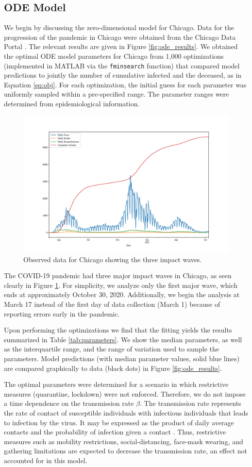 \documentclass[11pt]{article}
\begin{document}
\subsection{ODE Model}
We begin by discussing the zero-dimensional model for Chicago.
Data for the progression of the pandemic in Chicago were obtained from the Chicago Data Portal \cite{Chicago_2021}.
The relevant results are given in Figure \ref{fig:ode_results}.
We obtained the optimal ODE model parameters for Chicago from 1,000 optimizations (implemented in MATLAB via the \verb|fminsearch| function)
that compared model predictions to jointly the number of cumulative infected and the deceased, as in Equation \ref{eq:obj}.
For each optimization, the initial guess for each parameter was uniformly sampled within a pre-specified range.
The parameter ranges were determined from epidemiological information.

\begin{figure}[h]
	\centering
	\includegraphics[width=.6\textwidth]{obs_data}
	\caption{Observed data for Chicago showing the three impact waves.}
	\label{fig:obs_data}
\end{figure}

The COVID-19 pandemic had three major impact waves in Chicago, as seen clearly in Figure \ref{fig:obs_data}.
For simplicity, we analyze only the first major wave, which ends at approximately October 30, 2020.
Additionally, we begin the analysis at March 17 instead of the first day of data collection (March 1) because of reporting errors early in the pandemic.

Upon performing the optimizations we find that the fitting yields the results summarized in Table \ref{tab:parameters}.
We show the median parameters, as well as the interquartile range, and the range of variation used to sample the parameters.
Model predictions (with median parameter values, solid blue lines) are compared graphically to data (black dots) in Figure \ref{fig:ode_results}.

The optimal parameters were determined for a scenario in which restrictive measures (quarantine, lockdown) were not enforced.
Therefore, we do not impose a time dependence on the transmission rate $\beta$.
The transmission rate represents the rate of contact of susceptible individuals with infectious individuals that leads to infection by the virus.
It may be expressed as the product of daily average contacts and the probability of infection given a contact \cite{Drossinos_2020}.
Thus, restrictive measures such as mobility restrictions, social-distancing, face-mask wearing, and gathering limitations are expected to decrease the transmission rate, an effect not accounted for in this model.
\end{document}
